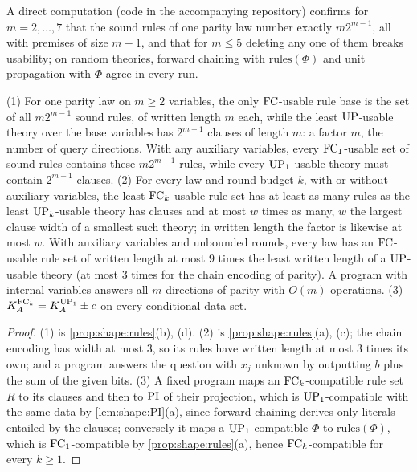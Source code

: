 A direct computation (code in the accompanying repository) confirms for $m=2,\dots,7$ that the sound rules of one parity law number exactly $m2^{m-1}$, all with premises of size $m-1$, and that for $m\le5$ deleting any one of them breaks usability; on random theories, forward chaining with $\mathrm{rules}(\Phi)$ and unit propagation with $\Phi$ agree in every run.

\begin{theorem}\label{thm:shape:directions}
(1) For one parity law on $m\ge2$ variables, the only $\mathrm{FC}$-usable rule base is the set of all $m2^{m-1}$ sound rules, of written length $m$ each, while the least $\mathrm{UP}$-usable theory over the base variables has $2^{m-1}$ clauses of length $m$: a factor $m$, the number of query directions. With any auxiliary variables, every $\mathrm{FC}_1$-usable set of sound rules contains these $m2^{m-1}$ rules, while every $\mathrm{UP}_1$-usable theory must contain $2^{m-1}$ clauses.
(2) For every law and round budget $k$, with or without auxiliary variables, the least $\mathrm{FC}_k$-usable rule set has at least as many rules as the least $\mathrm{UP}_k$-usable theory has clauses and at most $w$ times as many, $w$ the largest clause width of a smallest such theory; in written length the factor is likewise at most $w$. With auxiliary variables and unbounded rounds, every law has an $\mathrm{FC}$-usable rule set of written length at most $9$ times the least written length of a $\mathrm{UP}$-usable theory (at most $3$ times for the chain encoding of parity). A program with internal variables answers all $m$ directions of parity with $O(m)$ operations.
(3) $K_{A}^{\mathrm{FC}_k}=K_{A}^{\mathrm{UP}_1}\pm c$ on every conditional data set.
\end{theorem}

\begin{proof}
(1) is \cref{prop:shape:rules}(b), (d). (2) is \cref{prop:shape:rules}(a), (c); the chain encoding has width at most $3$, so its rules have written length at most $3$ times its own; and a program answers the question with $x_j$ unknown by outputting $b$ plus the sum of the given bits. (3) A fixed program maps an $\mathrm{FC}_k$-compatible rule set $R$ to its clauses and then to $\mathrm{PI}$ of their projection, which is $\mathrm{UP}_1$-compatible with the same data by \cref{lem:shape:PI}(a), since forward chaining derives only literals entailed by the clauses; conversely it maps a $\mathrm{UP}_1$-compatible $\Phi$ to $\mathrm{rules}(\Phi)$, which is $\mathrm{FC}_1$-compatible by \cref{prop:shape:rules}(a), hence $\mathrm{FC}_k$-compatible for every $k\ge1$.
\end{proof}

